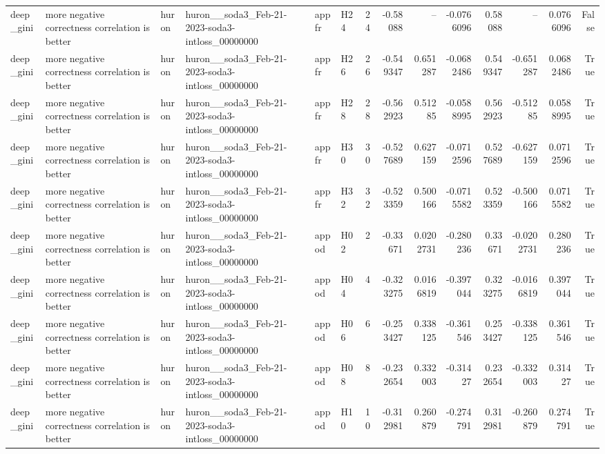 \begin{longtable}{llllllrrrrrrrr}
deep\_gini & more negative correctness correlation is better & huron & huron\_\_soda3\_Feb-21-2023-soda3-intloss\_00000000 & appfr & H24 & 24 & -0.58088 & -- & -0.0766096 & 0.58088 & -- & 0.0766096 & False \\
deep\_gini & more negative correctness correlation is better & huron & huron\_\_soda3\_Feb-21-2023-soda3-intloss\_00000000 & appfr & H26 & 26 & -0.549347 & 0.651287 & -0.0682486 & 0.549347 & -0.651287 & 0.0682486 & True \\
deep\_gini & more negative correctness correlation is better & huron & huron\_\_soda3\_Feb-21-2023-soda3-intloss\_00000000 & appfr & H28 & 28 & -0.562923 & 0.51285 & -0.0588995 & 0.562923 & -0.51285 & 0.0588995 & True \\
deep\_gini & more negative correctness correlation is better & huron & huron\_\_soda3\_Feb-21-2023-soda3-intloss\_00000000 & appfr & H30 & 30 & -0.527689 & 0.627159 & -0.0712596 & 0.527689 & -0.627159 & 0.0712596 & True \\
deep\_gini & more negative correctness correlation is better & huron & huron\_\_soda3\_Feb-21-2023-soda3-intloss\_00000000 & appfr & H32 & 32 & -0.523359 & 0.500166 & -0.0715582 & 0.523359 & -0.500166 & 0.0715582 & True \\
deep\_gini & more negative correctness correlation is better & huron & huron\_\_soda3\_Feb-21-2023-soda3-intloss\_00000000 & appod & H02 & 2 & -0.33671 & 0.0202731 & -0.280236 & 0.33671 & -0.0202731 & 0.280236 & True \\
deep\_gini & more negative correctness correlation is better & huron & huron\_\_soda3\_Feb-21-2023-soda3-intloss\_00000000 & appod & H04 & 4 & -0.323275 & 0.0166819 & -0.397044 & 0.323275 & -0.0166819 & 0.397044 & True \\
deep\_gini & more negative correctness correlation is better & huron & huron\_\_soda3\_Feb-21-2023-soda3-intloss\_00000000 & appod & H06 & 6 & -0.253427 & 0.338125 & -0.361546 & 0.253427 & -0.338125 & 0.361546 & True \\
deep\_gini & more negative correctness correlation is better & huron & huron\_\_soda3\_Feb-21-2023-soda3-intloss\_00000000 & appod & H08 & 8 & -0.232654 & 0.332003 & -0.31427 & 0.232654 & -0.332003 & 0.31427 & True \\
deep\_gini & more negative correctness correlation is better & huron & huron\_\_soda3\_Feb-21-2023-soda3-intloss\_00000000 & appod & H10 & 10 & -0.312981 & 0.260879 & -0.274791 & 0.312981 & -0.260879 & 0.274791 & True \\

\end{longtable}

